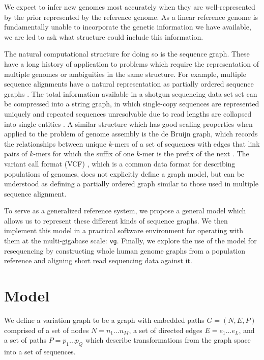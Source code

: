 \documentclass[12pt]{article}
\begin{document}
We expect to infer new genomes most accurately when they are well-represented by the prior represented by the reference genome.
As a linear reference genome is fundamentally unable to incorporate the genetic information we have available, we are led to ask what structure could include this information.

The natural computational structure for doing so is the sequence graph.
These have a long history of application to problems which require the representation of multiple genomes or ambiguities in the same structure.
For example, multiple sequence alignments have a natural representation as partially ordered sequence graphs \cite{lee2002POA}.
The total information available in a shotgun sequencing data set set can be compressed into a string graph, in which single-copy sequences are represented uniquely and repeated sequences unresolvable due to read lengths are collapsed into single entities \cite{myers2005, simpson2010}.
A similar structure which has good scaling properties when applied to the problem of genome assembly is the de Bruijn graph, which records the relationships between unique $k$-mers of a set of sequences with edges that link pairs of $k$-mers for which the suffix of one $k$-mer is the prefix of the next \cite{iqbal2012}.
The variant call format (VCF) \cite{danecek2011}, which is a common data format for describing populations of genomes, does not explicitly define a graph model, but can be understood as defining a partially ordered graph similar to those used in multiple sequence alignment. 

To serve as a generalized reference system, we propose a general model which allows us to represent these different kinds of sequence graphs. We then implement this model in a practical software environment for operating with them at the multi-gigabase scale: {\tt vg}. Finally, we explore the use of the model for resequencing by constructing whole human genome graphs from a population reference and aligning short read sequencing data against it.

\section{Model}

We define a variation graph to be a graph with embedded paths $G = ( N, E, P )$ comprised of
a set of nodes $N = n_1 \ldots n_M$,
a set of directed edges $E = e_1 \ldots e_L$,
and a set of paths $P = p_1 \ldots p_Q$ which describe transformations from the graph space into a set of sequences.
\end{document}
